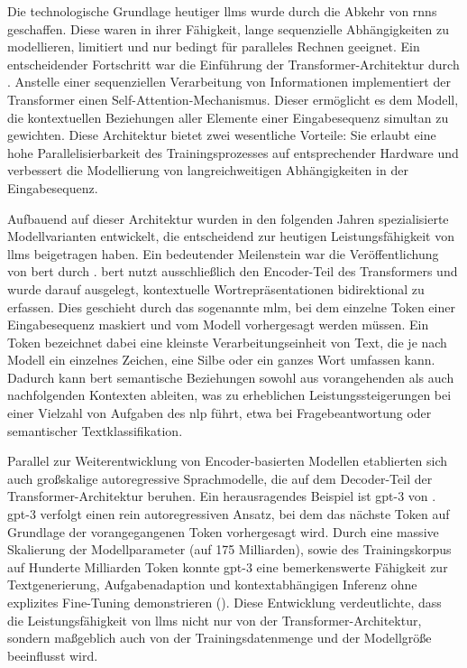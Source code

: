 Die technologische Grundlage heutiger \glspl{llm} wurde durch die Abkehr von \glspl{rnn} geschaffen.
Diese waren in ihrer Fähigkeit, lange sequenzielle Abhängigkeiten zu modellieren, limitiert und nur bedingt für paralleles Rechnen geeignet\autocite{vaswani_attention_2023}.
Ein entscheidender Fortschritt war die Einführung der Transformer-Architektur durch \citeauthor{vaswani_attention_2023} \autocite{vaswani_attention_2023}.
Anstelle einer sequenziellen Verarbeitung von Informationen implementiert der Transformer einen Self-Attention-Mechanismus.
Dieser ermöglicht es dem Modell, die kontextuellen Beziehungen aller Elemente einer Eingabesequenz simultan zu gewichten.
Diese Architektur bietet zwei wesentliche Vorteile: Sie erlaubt eine hohe Parallelisierbarkeit des Trainingsprozesses auf entsprechender Hardware und verbessert die Modellierung von langreichweitigen Abhängigkeiten in der Eingabesequenz\autocite{vaswani_attention_2023}.

Aufbauend auf dieser Architektur wurden in den folgenden Jahren spezialisierte Modellvarianten entwickelt, die entscheidend zur heutigen Leistungsfähigkeit von \glspl{llm} beigetragen haben.
Ein bedeutender Meilenstein war die Veröffentlichung von \gls{bert} durch \citeauthor{devlin_bert_2019}\autocite{devlin_bert_2019}.
\gls{bert} nutzt ausschließlich den Encoder-Teil des Transformers und wurde darauf ausgelegt, kontextuelle Wortrepräsentationen bidirektional zu erfassen.
Dies geschieht durch das sogenannte \gls{mlm}, bei dem einzelne Token einer Eingabesequenz maskiert und vom Modell vorhergesagt werden müssen.
Ein Token bezeichnet dabei eine kleinste Verarbeitungseinheit von Text, die je nach Modell ein einzelnes Zeichen, eine Silbe oder ein ganzes Wort umfassen kann.
Dadurch kann \gls{bert} semantische Beziehungen sowohl aus vorangehenden als auch nachfolgenden Kontexten ableiten, was zu erheblichen Leistungssteigerungen bei einer Vielzahl von Aufgaben des \gls{nlp} führt, etwa bei Fragebeantwortung oder semantischer Textklassifikation\autocite{devlin_bert_2019}.

Parallel zur Weiterentwicklung von Encoder-basierten Modellen etablierten sich auch großskalige autoregressive Sprachmodelle, die auf dem Decoder-Teil der Transformer-Architektur beruhen.
Ein herausragendes Beispiel ist \gls{gpt}-3 von \citeauthor{brown_language_2020}\autocite{brown_language_2020}.
\gls{gpt}-3 verfolgt einen rein autoregressiven Ansatz, bei dem das nächste Token auf Grundlage der vorangegangenen Token vorhergesagt wird.
Durch eine massive Skalierung der Modellparameter (auf 175 Milliarden), sowie des Trainingskorpus auf Hunderte Milliarden Token konnte \gls{gpt}-3 eine bemerkenswerte Fähigkeit zur Textgenerierung, Aufgabenadaption und kontextabhängigen Inferenz ohne explizites Fine-Tuning demonstrieren ().
Diese Entwicklung verdeutlichte, dass die Leistungsfähigkeit von \glspl{llm} nicht nur von der Transformer-Architektur, sondern maßgeblich auch von der Trainingsdatenmenge und der Modellgröße beeinflusst wird.

